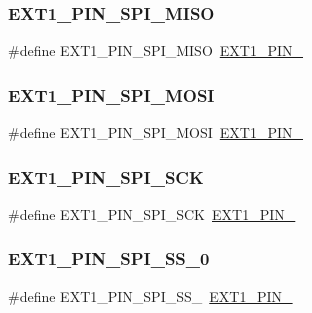 \subsubsection{\texorpdfstring{EXT1\_PIN\_SPI\_MISO}{EXT1\_PIN\_SPI\_MISO}}
{\footnotesize\ttfamily \#define E\+X\+T1\+\_\+\+P\+I\+N\+\_\+\+S\+P\+I\+\_\+\+M\+I\+SO~\mbox{\hyperlink{group__samd21__xplained__pro__features__group_ga197fec359c0525478beb868f1dee881c}{E\+X\+T1\+\_\+\+P\+I\+N\+\_}}}

\mbox{\label{group__samd21__xplained__pro__features__group_gaa1146522a2d847c6f5b5af5bb53e1f20}} 
\subsubsection{\texorpdfstring{EXT1\_PIN\_SPI\_MOSI}{EXT1\_PIN\_SPI\_MOSI}}
{\footnotesize\ttfamily \#define E\+X\+T1\+\_\+\+P\+I\+N\+\_\+\+S\+P\+I\+\_\+\+M\+O\+SI~\mbox{\hyperlink{group__samd21__xplained__pro__features__group_ga0b80b69996d0b582265a265f7a232df6}{E\+X\+T1\+\_\+\+P\+I\+N\+\_}}}

\mbox{\label{group__samd21__xplained__pro__features__group_gaa9c530476b2cb1e78323b367139e45f2}} 
\subsubsection{\texorpdfstring{EXT1\_PIN\_SPI\_SCK}{EXT1\_PIN\_SPI\_SCK}}
{\footnotesize\ttfamily \#define E\+X\+T1\+\_\+\+P\+I\+N\+\_\+\+S\+P\+I\+\_\+\+S\+CK~\mbox{\hyperlink{group__samd21__xplained__pro__features__group_ga87e6c1040a86c8f03b5f21f58cf8c0b5}{E\+X\+T1\+\_\+\+P\+I\+N\+\_}}}

\mbox{\label{group__samd21__xplained__pro__features__group_ga20b2da5a3388a3bb00b41636000bd633}} 
\subsubsection{\texorpdfstring{EXT1\_PIN\_SPI\_SS\_0}{EXT1\_PIN\_SPI\_SS\_0}}
{\footnotesize\ttfamily \#define E\+X\+T1\+\_\+\+P\+I\+N\+\_\+\+S\+P\+I\+\_\+\+S\+S\+\_~\mbox{\hyperlink{group__samd21__xplained__pro__features__group_ga8cfe9248015c92ac426486d0d9a4db4c}{E\+X\+T1\+\_\+\+P\+I\+N\+\_}}}

